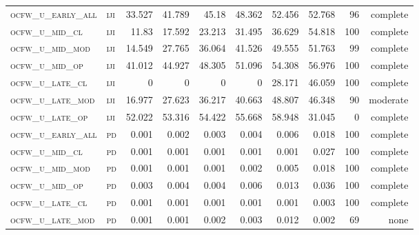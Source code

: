 \begin{landscape}
\begin{center}
\begin{footnotesize}
\begin{longtable}{llrrrrr|rrr}
\textsc{ocfw\_u\_early\_all} & \textsc{iji       }    & 33.527   & 41.789   & 45.18    & 48.362   & 52.456    & 52.768        & 96            & complete       \\
\textsc{ocfw\_u\_mid\_cl   } & \textsc{iji       }    & 11.83    & 17.592   & 23.213   & 31.495   & 36.629    & 54.818        & 100           & complete            \\
\textsc{ocfw\_u\_mid\_mod  } & \textsc{iji       }    & 14.549   & 27.765   & 36.064   & 41.526   & 49.555    & 51.763        & 99            & complete       \\
\textsc{ocfw\_u\_mid\_op   } & \textsc{iji       }    & 41.012   & 44.927   & 48.305   & 51.096   & 54.308    & 56.976        & 100           & complete            \\
\textsc{ocfw\_u\_late\_cl  } & \textsc{iji       }    & 0        & 0        & 0        & 0        & 28.171    & 46.059        & 100           & complete            \\
\textsc{ocfw\_u\_late\_mod } & \textsc{iji       }    & 16.977   & 27.623   & 36.217   & 40.663   & 48.807    & 46.348        & 90            & moderate       \\
\textsc{ocfw\_u\_late\_op  } & \textsc{iji       }    & 52.022   & 53.316   & 54.422   & 55.668   & 58.948    & 31.045        & 0             & complete           \\
\textsc{ocfw\_u\_early\_all} & \textsc{pd        }    & 0.001    & 0.002    & 0.003    & 0.004    & 0.006     & 0.018         & 100           & complete            \\
\textsc{ocfw\_u\_mid\_cl   } & \textsc{pd        }    & 0.001    & 0.001    & 0.001    & 0.001    & 0.001     & 0.027         & 100           & complete            \\
\textsc{ocfw\_u\_mid\_mod  } & \textsc{pd        }    & 0.001    & 0.001    & 0.001    & 0.002    & 0.005     & 0.018         & 100           & complete            \\
\textsc{ocfw\_u\_mid\_op   } & \textsc{pd        }    & 0.003    & 0.004    & 0.004    & 0.006    & 0.013     & 0.036         & 100           & complete            \\
\textsc{ocfw\_u\_late\_cl  } & \textsc{pd        }    & 0.001    & 0.001    & 0.001    & 0.001    & 0.001     & 0.003         & 100           & complete            \\
\textsc{ocfw\_u\_late\_mod } & \textsc{pd        }    & 0.001    & 0.001    & 0.002    & 0.003    & 0.012     & 0.002         & 69            & none       \\

\end{longtable}
\end{footnotesize}
\end{center}
\end{landscape}
